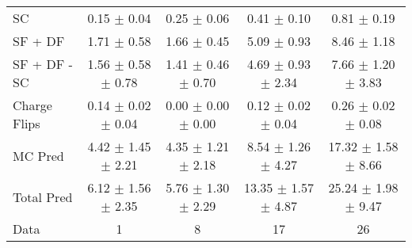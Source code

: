 \begin{tabular}{l|cccc}
                                 SC &  0.15 $\pm$  0.04 &  0.25 $\pm$  0.06 &  0.41 $\pm$  0.10 &  0.81 $\pm$  0.19 \\
                            SF + DF &  1.71 $\pm$  0.58 &  1.66 $\pm$  0.45 &  5.09 $\pm$  0.93 &  8.46 $\pm$  1.18 \\
\hline
                       SF + DF - SC &  1.56 $\pm$  0.58 $\pm$  0.78 &  1.41 $\pm$  0.46 $\pm$  0.70 &  4.69 $\pm$  0.93 $\pm$  2.34 &  7.66 $\pm$  1.20 $\pm$  3.83 \\
\hline\hline
                       Charge Flips &  0.14 $\pm$  0.02 $\pm$  0.04 &  0.00 $\pm$  0.00 $\pm$  0.00 &  0.12 $\pm$  0.02 $\pm$  0.04 &  0.26 $\pm$  0.02 $\pm$  0.08 \\
\hline
                            MC Pred &  4.42 $\pm$  1.45 $\pm$  2.21 &  4.35 $\pm$  1.21 $\pm$  2.18 &  8.54 $\pm$  1.26 $\pm$  4.27 & 17.32 $\pm$  1.58 $\pm$  8.66 \\
\hline
                         Total Pred &  6.12 $\pm$  1.56 $\pm$  2.35 &  5.76 $\pm$  1.30 $\pm$  2.29 & 13.35 $\pm$  1.57 $\pm$  4.87 & 25.24 $\pm$  1.98 $\pm$  9.47 \\
\hline\hline
                               Data &     1 &     8 &    17 &    26 \\
\hline\hline
\end{tabular}


